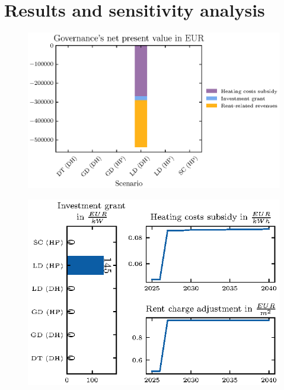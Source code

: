 \section{Results and sensitivity analysis}\label{results}


\begin{figure}[h]
	\centering
	\includegraphics[width=1\linewidth]{figures/4_Results/fig_npv_comparison/net_present_value.eps}
	\caption{}
	\label{fig:npv_comparison}
\end{figure}

\begin{figure}[h]
	\centering
	\includegraphics[width=1\linewidth]{figures/4_Results/fig_rent_subsidy_development/price_dev.eps}
	\caption{}
	\label{fig:sub_rent_dev}
\end{figure}



